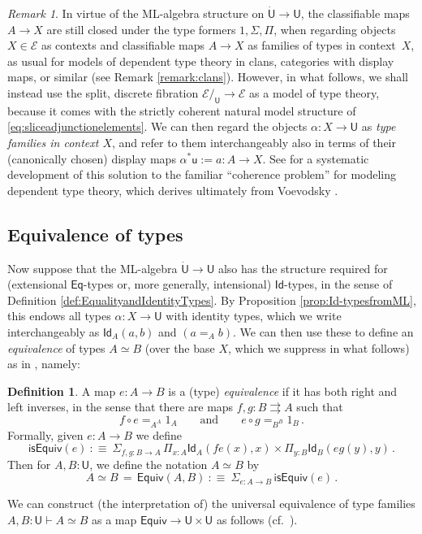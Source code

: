 \documentclass[12pt,reqno]{amsart}
\newcommand{\EE}{\ensuremath{\mathcal{E}}}
\renewcommand{\to}{\ensuremath{\rightarrow}}
\newcommand{\tto}{\ensuremath{\rightrightarrows}}
\newcommand{\Id}{\mathsf{Id}}
\renewcommand{\t}{\ensuremath{\mathsf{u}}}
\newcommand{\T}{\ensuremath{\mathsf{U}}}
\newcommand{\TT}{\ensuremath{\dot{\mathsf{U}}}}
\theoremstyle{remark}
\newtheorem{remark}[theorem]{Remark}
\theoremstyle{definition}
\newtheorem{definition}[theorem]{Definition}
\begin{document}
\begin{remark}\label{remark:classifyingmaps}
In virtue of the ML-algebra structure on $\TT\to\T$, the classifiable maps $A\to X$ are still closed under the type formers $1, \Sigma, \Pi$, when  regarding objects $X \in \EE$ as contexts and classifiable maps $A\to X$ as families of types in context~$X$, as usual for models of dependent type theory in clans, categories with display maps, or similar (see Remark \ref{remark:clans}).  However, in what follows, we shall instead use the split, discrete fibration $\EE/_\T \to \EE$ as a model of type theory, because it comes with the strictly coherent natural model structure of \eqref{eq:sliceadjunctionelements}.  We can then regard the objects $\alpha : X \to \T$ as \emph{type families in context $X$}, and refer to them interchangeably also in terms of their (canonically chosen) display maps $\alpha^*\t := a : A \to X$.  See \cite[\S 1--3]{AGH} for a systematic development of this solution to the familiar ``coherence problem'' \cite{Hofmann:1994} for modeling dependent type theory, which derives ultimately from Voevodsky \cite{KL:VV}.  
\end{remark}

\subsection{Equivalence of types}\label{sec:equivalence}

Now suppose that the ML-algebra $\TT \to \T$ also has the structure required for (extensional $\mathsf{Eq}$-types or, more generally, intensional) $\Id{}$-types, in the sense of Definition \ref{def:EqualityandIdentityTypes}.  By Proposition \ref{prop:Id-typesfromML}, this endows all types $\alpha : X \to \T$ with identity types, which we write interchangeably as $\Id_{A}(a, b)$ and $(a =_A b)$.   We can then use these to define an \emph{equivalence} of types $A\simeq B$ (over the base $X$, which we suppress in what follows) as in \cite[\S 4.3]{HoTTbook}, namely:
%
\begin{definition}
 A map $e : A\to B$ is a (type) \emph{equivalence} if it has both right and left inverses, in the sense that there are maps $f, g : B\tto A$ such that 
 \[
f\circ e =_{A^A} 1_A \qquad\text{and}\qquad  e\circ g =_{B^B} 1_B  \,.
 \]
 Formally, given $e : A\to B$ we define 
 \[
 \mathsf{isEquiv}(e)\ :\equiv\ \Sigma_{f, g: B\to A}\,  \Pi_{x:A}\Id_{A}(fe(x) , x) \times \Pi_{y:B}\Id_{B}(eg(y), y) \,.
 \]
Then for $A, B: \T$, we define the notation $A \simeq B$ by
 \[
A \simeq B\, =\, \mathsf{Equiv}(A,B)\ :\equiv\  \Sigma_{e : A\to B}\, \mathsf{isEquiv}(e)\,.
 \]
\end{definition}
We can construct (the interpretation of) the universal equivalence of type families $A, B : \T \vdash A \simeq B$ as a map $\mathsf{Equiv} \to \T \times \T$ as follows (cf.\ \cite{KL:VV}).
\end{document}
